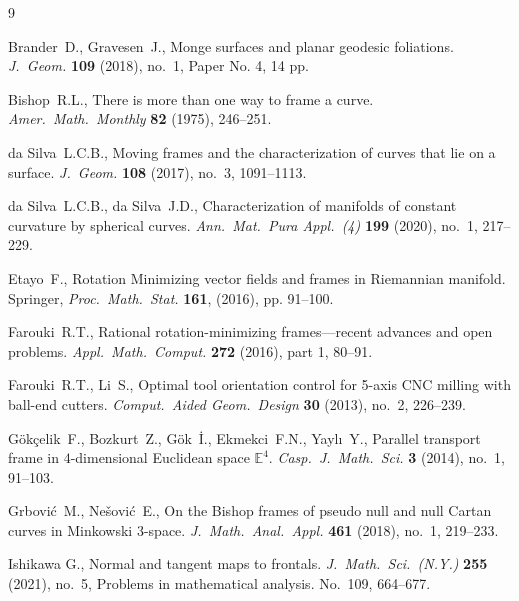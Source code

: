 \documentclass[a4paper]{amsart}
\theoremstyle{definition}
\theoremstyle{remark}
\numberwithin{equation}{section}
\begin{document}
\begin{thebibliography}{9}

    Brander\ D., Gravesen\ J., Monge surfaces and planar geodesic foliations. \textit{J.\ Geom.} \textbf{109} (2018), no.\ 1, Paper No. 4, 14 pp.

      Bishop\ R.L., There is more than one way to frame a curve. \textit{Amer.\ Math.\ Monthly} \textbf{82} (1975), 246--251.

     da Silva\ L.C.B., Moving frames and the characterization of curves that lie on a surface. \textit{J.\ Geom.} \textbf{108} (2017), no.\ 3, 1091--1113.
    
    da Silva\ L.C.B., da Silva\ J.D., 
    Characterization of manifolds of constant curvature by spherical curves. 
    \textit{Ann.\ Mat.\ Pura Appl.\ (4)} \textbf{199} (2020), no.\ 1, 217--229.    
 
    
    Etayo\ F., Rotation Minimizing vector fields and frames in Riemannian manifold. Springer, \textit{Proc.\ Math.\ Stat.} \textbf{161}, (2016), pp. 91--100.
    
    Farouki\ R.T., Rational rotation-minimizing frames—recent advances and open problems. \textit{Appl.\ Math.\ Comput.} \textbf{272} (2016), part 1, 80--91.


     Farouki\ R.T., Li\ S., 
    Optimal tool orientation control for 5-axis CNC milling with ball-end cutters. \textit{Comput.\ Aided Geom.\ Design} \textbf{30} (2013), no.\ 2, 226--239.
    
    G\"ok\c{c}elik\ F., Bozkurt\ Z., G\"ok\ \.{I}., Ekmekci\ F.N., Yayl\i\ Y., 
    Parallel transport frame in $4$-dimensional Euclidean space $\mathbb{E}^4$. \textit{Casp.\ J.\ Math.\ Sci.} \textbf{3} (2014), no.\ 1, 91--103.
    


    Grbovi\'c\ M., Ne\v{s}ovi\'c\ E., 
    On the Bishop frames of pseudo null and null Cartan curves in Minkowski $3$-space. 
    \textit{J.\ Math.\ Anal.\ Appl.} \textbf{461} (2018), no.\ 1, 219--233.
    

    Ishikawa G., 
    Normal and tangent maps to frontals.
    \textit{J.\ Math.\ Sci.\ (N.Y.)} \textbf{255} (2021), no.\ 5, Problems in mathematical analysis. No.\ 109, 664--677.



\end{thebibliography}
\end{document}
